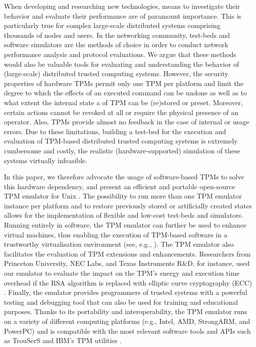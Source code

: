 \documentclass[11pt,letterpaper]{article}
\begin{document}
When developing and researching new technologies, means to investigate their behavior and evaluate
their performance are of paramount importance. This is particularly true for complex large-scale
distributed systems comprising thousands of nodes and users.
In the networking community, test-beds and software simulators are the methods of choice in order
to conduct network performance analysis and protocol evaluations. We argue that these methods would
also be valuable tools for evaluating and understanding the behavior of (large-scale) distributed
trusted computing systems. However, the security properties of hardware TPMs permit only one TPM
per platform and limit the degree to which the effects of an executed command can be undone as well
as to what extent the internal state a of TPM can be (re)stored or preset. Moreover, certain actions
cannot be revoked at all or require the physical presence of an operator. Also, TPMs provide almost
no feedback in the case of internal or usage errors. Due to these limitations, building a test-bed
for the execution and evaluation of TPM-based distributed trusted computing systems is extremely
cumbersome and costly, the realistic (hardware-supported) simulation of these systems virtually
infeasible.

In this paper, we therefore advocate the usage of software-based TPMs to solve this hardware
dependency, and present an efficient and portable open-source TPM emulator for Unix \cite{TPMEmu}.
The possibility to run more than one TPM emulator instance per platform and to restore previously
stored or artificially created states allows for the implementation of flexible and low-cost
test-beds and simulators. Running entirely in software, the TPM emulator can further be used to
enhance virtual machines, thus enabling the execution of TPM-based software in a trustworthy
virtualisation environment (see, e.g., \cite{Xen}). The TPM emulator also facilitates the
evaluation of TPM extensions and enhancements. Researchers from Princeton University, NEC Labs, and
Texas Instruments R\&D, for instance, used our emulator to evaluate the impact on the TPM's energy
and execution time overhead if the RSA algorithm is replaced with elliptic curve cryptography (ECC)
\cite{Aaraj}. Finally, the emulator provides programmers of trusted systems with a powerful testing
and debugging tool that can also be used for training and educational purposes. Thanks to its
portability and interoperability, the TPM emulator runs on a variety of different computing
platforms (e.g., Intel, AMD, StrongARM, and PowerPC) and is compatible with the most relevant
software tools and APIs such as TrouSerS \cite{trousers} and IBM's TPM utilities \cite{IBMtools}.
\end{document}
